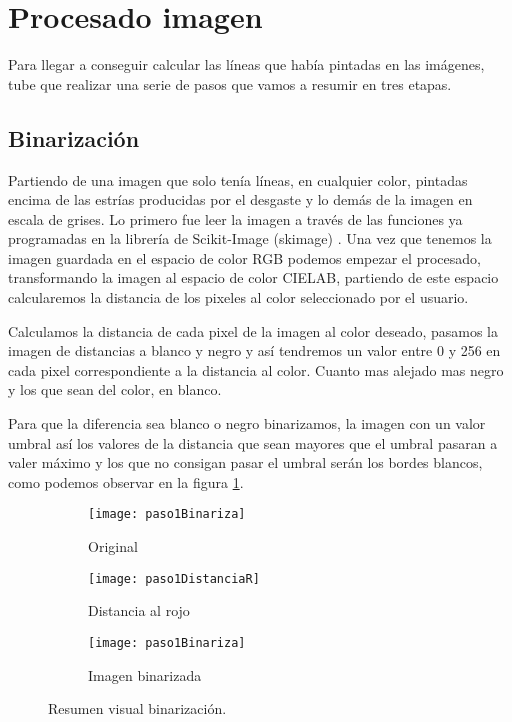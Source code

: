 \section{Procesado imagen}
Para llegar a conseguir calcular las líneas que había pintadas en las imágenes, tube que realizar una serie de pasos que vamos a resumir en tres etapas.
\subsection{Binarización}
Partiendo de una imagen que solo tenía líneas, en cualquier color, pintadas encima de las estrías producidas por el desgaste y lo demás de la imagen en escala de grises. Lo primero fue leer la imagen a través de las funciones ya programadas en la librería de Scikit-Image (skimage) \cite{scik:skeleton}.
Una vez que tenemos la imagen guardada en el espacio de color RGB podemos empezar el procesado, transformando la imagen al espacio de color CIELAB, partiendo de este espacio calcularemos la distancia de los pixeles al color seleccionado por el usuario.

Calculamos la distancia de cada pixel de la imagen al color deseado, pasamos la imagen de distancias a blanco y negro y así tendremos un valor entre 0 y 256 en cada pixel correspondiente a la distancia al color. Cuanto mas alejado mas negro y los que sean del color, en blanco.

Para que la diferencia sea blanco o negro binarizamos, la imagen con un valor umbral así los valores de la distancia que sean mayores que el umbral pasaran a valer máximo y los que no consigan pasar el umbral serán los bordes blancos, como podemos observar en la figura \ref{fig:5.4}.


\begin{figure}
\begin{subfigure}[c]{.5\linewidth}
\centering\large \texttt{[image: paso1Binariza]}
\caption{Original}
\end{subfigure}%
\begin{subfigure}[c]{.5\linewidth}
\centering\large \texttt{[image: paso1DistanciaR]}
\caption{Distancia al rojo}
\end{subfigure}
\begin{subfigure}[c]{.5\linewidth}
\centering\large \texttt{[image: paso1Binariza]}
\caption{Imagen binarizada}
\end{subfigure}
\caption{Resumen visual binarización.}\label{fig:5.4}
\end{figure}


